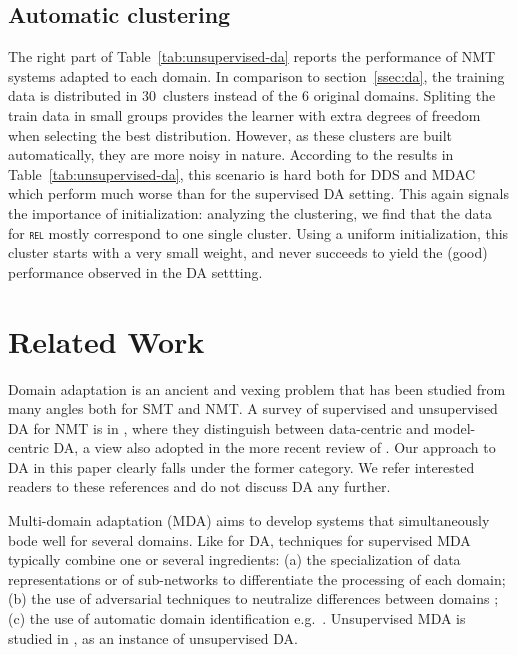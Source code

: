 \documentclass[11pt]{article}
\newcommand{\domain}[1]{\texttt{\textsc{#1}}}
\begin{document}
\subsection{Automatic clustering}\label{ssec:clda}
The right part of Table~\ref{tab:unsupervised-da} reports the performance of NMT systems adapted to each domain. In comparison to section~\ref{ssec:da}, the training data is distributed in 30~clusters instead of the 6 original domains. Spliting the train data in small groups provides the learner with extra degrees of freedom when selecting the best distribution. However, as these clusters are built automatically, they are more noisy in nature. According to the results in Table~\ref{tab:unsupervised-da}, this scenario is hard both for DDS and MDAC which perform much worse than for the supervised DA setting. This again signals the importance of initialization: analyzing the clustering, we find that the data for \domain{rel} mostly correspond to one single cluster. Using a uniform initialization, this cluster starts with a very small weight, and never succeeds to yield the (good) performance observed in the DA settting.

\section{Related Work \label{sec:related}}

Domain adaptation is an ancient and vexing problem that has been studied from many angles both for SMT and NMT. A survey of supervised and unsupervised DA for NMT is in \citet{Chu18asurvey}, where they distinguish between data-centric and model-centric DA, a view also adopted in the more recent review of \citet{Saunders21domain}. Our approach to DA in this paper clearly falls under the former category. We refer interested readers to these references and do not discuss DA any further.

Multi-domain adaptation (MDA) aims to develop systems that simultaneously bode well for several domains. Like for DA, techniques for supervised MDA typically combine one or several ingredients: (a) the specialization of data representations \citep{Kobus17domaincontrol} or of sub-networks \citep{Pham19generic} to differentiate the processing of each domain; (b) the use of adversarial techniques to neutralize differences between domains \citep{Britz17mixing,Zeng18multidomain}; (c) the use of automatic domain identification e.g.\ \citet{Jiang19multidomain}. Unsupervised MDA is studied in \citet{Farajian17multidomain}, as an instance of unsupervised DA.
\end{document}
